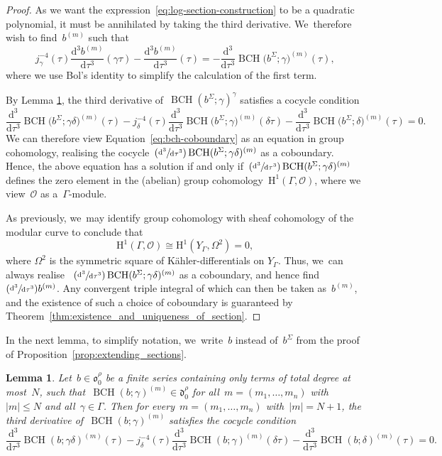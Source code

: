 \documentclass[JEP,XML,SOM,Unicode,published]{cedram}
\newcommand{\Psfrac}[2]{(\sfrac{#1}{#2})}
\theoremstyle{plain}
\newtheorem{lemma}[theoremcounter]{Lemma}
\theoremstyle{definition}
\newcommand{\tx}{\text}
\newcommand{\nbd}{\nobreakdash-\hspace{0pt}}
\newcommand{\cO}{\ensuremath{\mathcal{O}}}
\newcommand{\frakd}{\ensuremath{\mathfrak{d}}}
\newcommand{\frako}{\ensuremath{\mathfrak{o}}}
\newcommand{\rmd}{\ensuremath{\mathrm{d}}}
\newcommand{\rmH}{\ensuremath{\mathrm{H}}}
\let\Ga\Gamma
\let\ga\gamma
\DeclareMathOperator{\BCH}{BCH}
\newcommand{\dtau}{\rmd \tau}
\begin{document}
\begin{proof}
As we want the expression~\eqref{eq:log-section-construction} to be a quadratic polynomial, it must be annihilated by taking the third derivative. We~therefore wish to find~$b^{(m)}$ such that
\begin{equation}\label{eq:bch-coboundary}
j_\ga^{-4}(\tau)\frac{\rmd^3b^{(m)}}{\dtau^3}(\ga\tau)
- \frac{\rmd^3b^{(m)}}{\dtau^3}(\tau)
=
- \frac{\rmd^3}{\dtau^3}\BCH\bigl(b^\Sigma;\ga \bigr)^{(m)}(\tau)
\tx{,}
\end{equation}
where we use Bol's identity to simplify the calculation of the first term.

By Lemma \ref{lem:BCH-cocycle}, the third derivative of~$\BCH(b^\Sigma;\ga)^{\ga}$ satisfies a cocycle condition
\begin{equation*}
\frac{\rmd^3}{\dtau^3}\BCH\bigl(b^\Sigma;\ga\delta \bigr)^{(m)}(\tau)
- j_\delta^{-4}(\tau)\frac{\rmd^3}{\dtau^3}\BCH\bigl(b^\Sigma;\ga \bigr)^{(m)}(\delta\tau)
- \frac{\rmd^3}{\dtau^3}\BCH\bigl(b^\Sigma;\delta \bigr)^{(m)}(\tau)
=
0.
\end{equation*}
We can therefore view Equation~\eqref{eq:bch-coboundary} as an equation in group cohomology, realising the cocycle~$\Psfrac{\rmd^3}{\dtau^3}\BCH(b^\Sigma;\ga\delta)^{(m)}$ as a coboundary. Hence, the above equation has a solution if and only if~$\Psfrac{\rmd^3}{\dtau^3}\BCH(b^\Sigma;\ga\delta)^{(m)}$ defines the zero element in the (abelian) group cohomology~$\rmH^1(\Ga,\cO)$, where we view~$\cO$ as a~$\Ga$\nbd{}module.

As previously, we~may identify group cohomology with sheaf cohomology of the modular curve to conclude that
\begin{equation*}
\rmH^1(\Ga,\cO)
\cong
\rmH^1(Y_\Ga, \Omega^2) = 0
\tx{,}
\end{equation*}
where $\Omega^2$ is the symmetric square of Kähler-differentials on $Y_\Ga$. Thus, we~can always realise ~$\Psfrac{\rmd^3}{\dtau^3}\BCH(b^\Sigma;\ga\delta)^{(m)}$ as a coboundary, and hence find~$\Psfrac{\rmd^3}{\dtau^3}b^{(m)}$. Any convergent triple integral of which can then be taken as~$b^{(m)}$, and the existence of such a choice of coboundary is guaranteed by Theorem~\ref{thm:existence_and_uniqueness_of_section}.
\end{proof}

In the next lemma, to simplify notation, we~write~$b$ instead of~$b^\Sigma$ from the proof of Proposition~\ref{prop:extending_sections}.

\begin{lemma}\label{lem:BCH-cocycle}
Let~$b\in \frako_0^\rho$ be a finite series containing only terms of total degree at most~$N$, such that~$\BCH(b;\ga)^{(m)}\in\frakd_0^\rho$ for all~$m=(m_1,\ldots,m_n)$ with~$|m|\leq N$ and all~$\ga\in\Ga$. Then for every~$m=(m_1,\ldots,m_n)$ with~$|m|=N+1$, the third derivative of\/~$\BCH(b;\ga)^{(m)}$ satisfies the cocycle condition
\begin{equation*}
\frac{\rmd^3}{\dtau^3}\BCH(b;\ga\delta)^{(m)}(\tau)
- j_\delta^{-4}(\tau)\frac{\rmd^3}{\dtau^3}\BCH(b;\ga)^{(m)}(\delta\tau)
- \frac{\rmd^3}{\dtau^3}\BCH(b;\delta)^{(m)}(\tau)
=
0
\tx{.}
\end{equation*}
\end{lemma}
\end{document}
